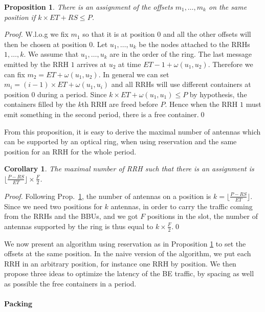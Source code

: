 \documentclass[10pt, conference, letterpaper]{IEEEtran}
\newtheorem{prop}{Proposition}
\newtheorem{corollary}{Corollary}[theorem]
\begin{document}
\begin{prop}
\label{prop:assign}
There is an assignment of the offsets $m_1, \dots, m_k$ on the same position if  $k\times ET + RS \leq P$.
\end{prop}
\begin{proof}
 W.l.o.g we fix $m_1$ so that it is at position $0$ and all the other offsets will then be chosen at position $0$.
 Let $u_1,\dots,u_k$ be the nodes attached to the RRHs $1,\dots,k$. We assume that $u_1,\dots,u_k$ are in the order of the ring. The last message emitted by the RRH $1$ arrives at $u_2$ at time $ET - 1 + \omega(u_1,u_2)$. Therefore we can fix $m_2 = ET  + \omega(u_1,u_2)$. In general we can set $m_i = (i-1) \times ET + \omega(u_1,u_i)$ and all RRHs will use different containers at position $0$ during a period. Since $k \times ET + \omega(u_1,u_1) \leq P$ by hypothesis,
 the containers filled by the $k$th RRH are freed before $P$. Hence when the RRH $1$ must emit something in the second period, there is a free container.\qed
\end{proof}

From this proposition, it is easy to derive the maximal number of antennas which can be supported by an optical ring,
when using reservation and the same position for an RRH for the whole period.

\begin{corollary}
The maximal number of RRH such that there is an assignment is $ \lfloor\frac{P- RS}{ET}\rfloor \times \frac{F}{2}$.
\end{corollary}
\begin{proof}
Following Prop.~\ref{prop:assign}, the number of antennas on a position is $k = \lfloor\frac{P- RS}{ET}\rfloor $.
Since we need two positions for $k$ antennas, in order to carry the traffic coming from the RRHs and the BBUs, and we got $F$ positions in the slot, the number of antennas supported by the ring is thus equal to $k \times \frac{F}{2}$.\qed
\end{proof}


We now present an algorithm using reservation as in Proposition \ref{prop:assign} to set the offsets at the same position.
In the naive version of the algorithm, we put each RRH in an arbitrary position, for instance one RRH by position.
 We then propose three ideas to optimize the latency of the BE traffic, by spacing as well as possible the free containers in a period.


\paragraph{Packing}
\end{document}
